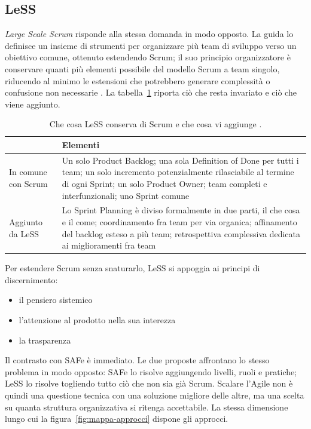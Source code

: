 \subsection{LeSS}

\emph{Large Scale Scrum} risponde alla stessa domanda in modo opposto. La guida
lo definisce un insieme di strumenti per organizzare pi\`u team di sviluppo
verso un obiettivo comune, ottenuto estendendo Scrum; il suo principio
organizzatore \`e conservare quanti pi\`u elementi possibile del modello Scrum
a team singolo, riducendo al minimo le estensioni che potrebbero generare
complessit\`a o confusione non necessarie \cite{agilepracticeguide2}. La
tabella~\ref{tab:less} riporta ci\`o che resta invariato e ci\`o che viene
aggiunto.

\begin{table}[htbp]
\centering
\small
\caption{Che cosa LeSS conserva di Scrum e che cosa vi aggiunge
\cite{agilepracticeguide2}.}
\label{tab:less}
\begin{tabularx}{\textwidth}{@{}>{\raggedright\arraybackslash}p{2.6cm}X@{}}
\toprule
\textbf{} & \textbf{Elementi} \\
\midrule
In comune con Scrum &
Un solo Product Backlog; una sola Definition of Done per tutti i team; un solo
incremento potenzialmente rilasciabile al termine di ogni Sprint; un solo
Product Owner; team completi e interfunzionali; uno Sprint comune \\
\addlinespace
Aggiunto da LeSS &
Lo Sprint Planning \`e diviso formalmente in due parti, il che cosa e il come;
coordinamento fra team per via organica; affinamento del backlog esteso a pi\`u
team; retrospettiva complessiva dedicata ai miglioramenti fra team \\
\bottomrule
\end{tabularx}
\end{table}

Per estendere Scrum senza snaturarlo, LeSS si appoggia ai
principi di discernimento:
\begin {itemize}
\item il pensiero sistemico
\item l'attenzione al prodotto nella sua interezza
\item la trasparenza 
\end{itemize}

Il contrasto con SAFe \`e immediato. Le due proposte
affrontano lo stesso problema in modo opposto: SAFe lo risolve aggiungendo
livelli, ruoli e pratiche; LeSS lo risolve togliendo tutto ci\`o che non sia
gi\`a Scrum. Scalare l'Agile non \`e quindi una questione tecnica con una
soluzione migliore delle altre, ma una scelta su quanta struttura organizzativa
si ritenga accettabile. La stessa dimensione lungo cui la
figura~\ref{fig:mappa-approcci} dispone gli approcci.

